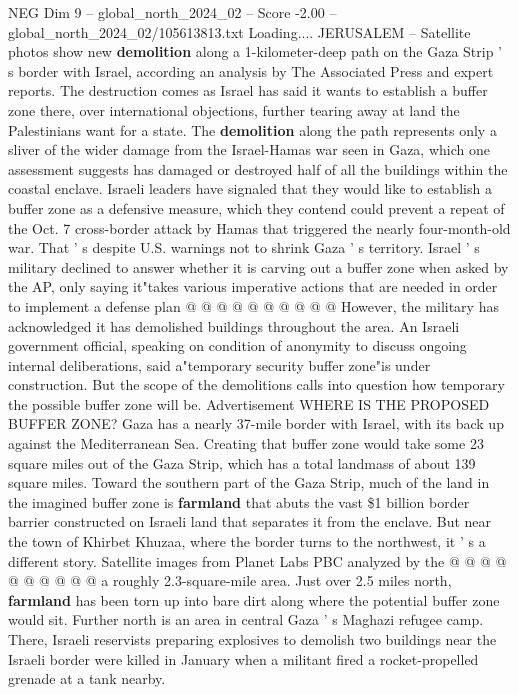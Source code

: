 \begin{textsample}{NEG Dim 9 – global\_north\_2024\_02 – Score -2.00 – global\_north\_2024\_02/105613813.txt}  \label{ex:f9_neg_236}
Loading....
JERUSALEM -- Satellite photos show new \textbf{demolition} along a 1-kilometer-deep path on the Gaza Strip ' s border with Israel, according an analysis by The Associated Press and expert reports.
The destruction comes as Israel has said it wants to establish a buffer zone there, over international objections, further tearing away at land the Palestinians want for a state.
The \textbf{demolition} along the path represents only a sliver of the wider damage from the Israel-Hamas war seen in Gaza, which one assessment suggests has damaged or destroyed half of all the buildings within the coastal enclave.
Israeli leaders have signaled that they would like to establish a buffer zone as a defensive measure, which they contend could prevent a repeat of the Oct. 7 cross-border attack by Hamas that triggered the nearly four-month-old war.
That ' s despite U.S. warnings not to shrink Gaza ' s territory.
Israel ' s military declined to answer whether it is carving out a buffer zone when asked by the AP, only saying it"takes various imperative actions that are needed in order to implement a defense plan @ @ @ @ @ @ @ @ @ @ However, the military has acknowledged it has demolished buildings throughout the area.
An Israeli government official, speaking on condition of anonymity to discuss ongoing internal deliberations, said a"temporary security buffer zone"is under construction.
But the scope of the demolitions calls into question how temporary the possible buffer zone will be.
Advertisement WHERE IS THE PROPOSED BUFFER ZONE?
Gaza has a nearly 37-mile border with Israel, with its back up against the Mediterranean Sea.
Creating that buffer zone would take some 23 square miles out of the Gaza Strip, which has a total landmass of about 139 square miles.
Toward the southern part of the Gaza Strip, much of the land in the imagined buffer zone is \textbf{farmland} that abuts the vast \$1 billion border barrier constructed on Israeli land that separates it from the enclave.
But near the town of Khirbet Khuzaa, where the border turns to the northwest, it ' s a different story.
Satellite images from Planet Labs PBC analyzed by the @ @ @ @ @ @ @ @ @ @ a roughly 2.3-square-mile area.
Just over 2.5 miles north, \textbf{farmland} has been torn up into bare dirt along where the potential buffer zone would sit.
Further north is an area in central Gaza ' s Maghazi refugee camp.
There, Israeli reservists preparing explosives to demolish two buildings near the Israeli border were killed in January when a militant fired a rocket-propelled grenade at a tank nearby.

\end{textsample}

